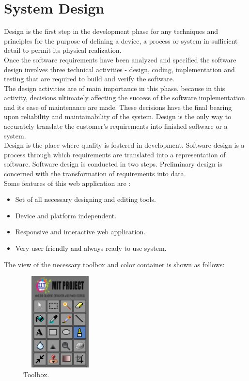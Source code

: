 \documentclass[12pt,a4 paper]{report}
\begin{document}
\section{System Design}

Design is the first step in the development phase for any techniques and principles for the purpose of defining a device, a process or system in sufficient detail to permit its physical realization. \\
 
Once the software requirements have been analyzed and specified the software design involves three technical activities - design, coding, implementation and testing that are required to build and verify the software. \\
 
The design activities are of main importance in this phase, because in this activity, decisions ultimately affecting the success of the software implementation and its ease of maintenance are made. These decisions have the final bearing upon reliability and maintainability of the system. Design is the only way to accurately translate the customer's requirements into finished software or a system. \\
 
Design is the place where quality is fostered in development. Software design is a process through which requirements are translated into a representation of software. Software design is conducted in two steps. Preliminary design is concerned with the transformation of requirements into data. \\

Some features of this web application are :

\begin{itemize}
\item Set of all necessary designing and editing tools.
\item Device and platform independent.  
\item Responsive and interactive web application. 
\item Very user friendly and always ready to use system.
\end{itemize}

The view of the necessary toolbox and color container is shown as follows: \\

\begin{figure}[h]
\begin{center}
\includegraphics[width=4cm, height=5cm]{tools.png}
\caption{Toolbox.}
\end{center}
\end{figure}
\end{document}
